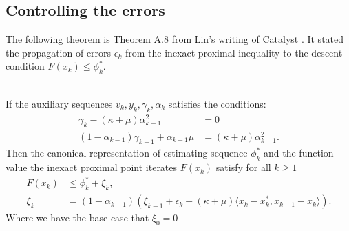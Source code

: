 \documentclass[12pt]{article}
\begin{document}
    \subsection{Controlling the errors}
        The following theorem is Theorem A.8 from Lin's writing of Catalyst \cite{lin_universal_2015}. 
        It stated the propagation of errors $\epsilon_k$ from the inexact proximal inequality to the descent condition $F(x_k) \le \phi_k^*$. 
        \begin{theorem}\;\\
            If the auxiliary sequences $v_k, y_k, \gamma_k, \alpha_k$ satisfies the conditions: 
            \begin{align*}
                \gamma_k - (\kappa + \mu)\alpha_{k - 1}^2 
                &= 0
                \\
                (1 - \alpha_{k - 1})\gamma_{k - 1} + \alpha_{k - 1}\mu 
                &= (\kappa + \mu)\alpha_{k - 1}^2. 
            \end{align*}
            Then the canonical representation of estimating sequence $\phi_k^*$ and the function value 
            the inexact proximal point iterates $F(x_k)$ satisfy for all $k\ge 1$
            \begin{align*}
                F(x_k) &\le \phi_k^* + \xi_k, 
                \\
                \xi_k &= 
                (1 - \alpha_{k - 1})(
                    \xi_{k - 1} + \epsilon_k 
                    - (\kappa + \mu)\langle x_k - x_k^*, x_{k - 1} - x_k\rangle
                ). 
            \end{align*}
            Where we have the base case that $\xi_0 = 0$
        \end{theorem}
\end{document}
